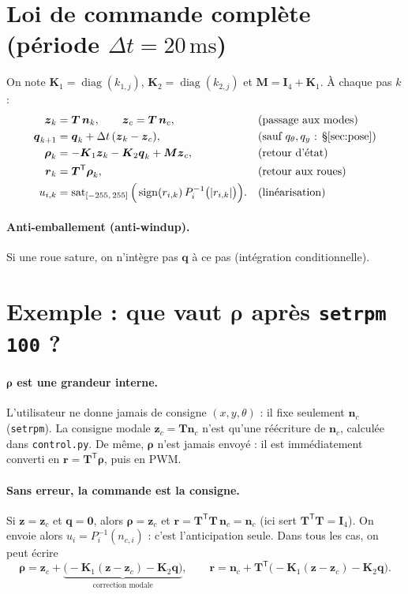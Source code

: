 \documentclass[11pt,a4paper]{article}
\newcommand{\SI}[2]{\ensuremath{#1\,\mathrm{#2}}}
\newcommand{\vect}[1]{\boldsymbol{#1}}
\newcommand{\T}{\mathsf{T}}
\newcommand{\Tm}{\vect{T}}
\begin{document}
\section{Loi de commande complète (période $\Delta t=\SI{20}{ms}$)}

On note $\vect K_1=\operatorname{diag}(k_{1,j})$, $\vect K_2=\operatorname{diag}(k_{2,j})$ et $\vect M=\vect I_4+\vect K_1$.
À chaque pas $k$ :
\begin{align}
\vect z_k&=\Tm\,\vect n_k,\qquad \vect z_c=\Tm\,\vect n_c, && \text{(passage aux modes)}\\
\vect q_{k+1}&=\vect q_k+\Delta t\,(\vect z_k-\vect z_c), && \text{(sauf $q_\theta,q_y$ : §\ref{sec:pose})}\\
\vect\rho_k&=-\vect K_1\vect z_k-\vect K_2\vect q_k+\vect M\vect z_c, && \text{(retour d'état)}\\
\vect r_k&=\Tm^\T\vect\rho_k, && \text{(retour aux roues)}\\
u_{i,k}&=\operatorname{sat}_{[-255,\,255]}\Big(\operatorname{sign}(r_{i,k})\,P_i^{-1}\big(|r_{i,k}|\big)\Big). && \text{(linéarisation)}
\end{align}
\paragraph{Anti-emballement (anti-windup).} Si une roue sature, on n'intègre pas $\vect q$ à ce pas (intégration conditionnelle).

\section{Exemple : que vaut $\vect\rho$ après \texttt{setrpm 100} ?}

\paragraph{$\vect\rho$ est une grandeur interne.}
L'utilisateur ne donne jamais de consigne $(x,y,\theta)$ : il fixe seulement $\vect n_c$ (\texttt{setrpm}).
La consigne modale $\vect z_c=\Tm\vect n_c$ n'est qu'une réécriture de $\vect n_c$, calculée dans \texttt{control.py}.
De même, $\vect\rho$ n'est jamais envoyé : il est immédiatement converti en $\vect r=\Tm^\T\vect\rho$, puis en PWM.

\paragraph{Sans erreur, la commande est la consigne.}
Si $\vect z=\vect z_c$ et $\vect q=\vect 0$, alors $\vect\rho=\vect z_c$ et
$\vect r=\Tm^\T\Tm\,\vect n_c=\vect n_c$ (ici sert $\Tm^\T\Tm=\vect I_4$).
On envoie alors $u_i=P_i^{-1}(n_{c,i})$ : c'est l'anticipation seule.
Dans tous les cas, on peut écrire
\begin{equation}
\vect\rho=\vect z_c+\underbrace{\big(-\vect K_1(\vect z-\vect z_c)-\vect K_2\vect q\big)}_{\text{correction modale}},
\qquad
\vect r=\vect n_c+\Tm^\T\big(-\vect K_1(\vect z-\vect z_c)-\vect K_2\vect q\big).
\end{equation}
\end{document}
